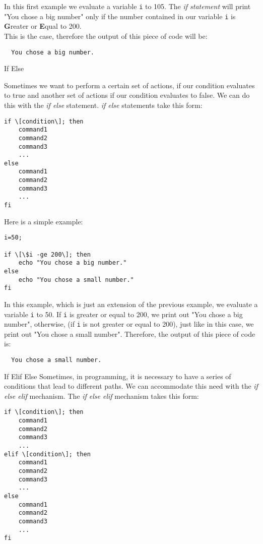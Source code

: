 \documentclass[hidelinks,12pt,a4paper,numbers=enddot]{scrartcl}
\begin{document}
In this first example we evaluate a variable \texttt{i} to 105.
The \emph{ if statement } will print "You chose a big number"
only if the number contained in our variable \texttt{i} is \textbf{G}reater or
\textbf{E}qual to 200. \\
This is the case, therefore the output of this piece of code will be:
\begin{verbatim}
  You chose a big number.
\end{verbatim}




 If Else 

Sometimes we want to perform a certain set of actions, if our condition evaluates to
true and another set of actions if our condition evaluates to false. We can do this with
the \emph{ if else } statement.
\emph{ if else } statements take this form:
\begin{verbatim}
if \[condition\]; then
    command1
    command2
    command3
    ...
else
    command1
    command2
    command3
    ...
fi
\end{verbatim}

Here is a simple example:
\begin{verbatim}
i=50;

if \[\$i -ge 200\]; then
    echo "You chose a big number."
else
    echo "You chose a small number."
fi
\end{verbatim}

In this example, which is just an extension of the previous example, we
evaluate a variable \texttt{i} to 50. If \texttt{i} is greater or equal to
200, we print out "You chose a big number", otherwise,
(if \texttt{i} is not greater or equal to 200), just like in this case, we print out
"You chose a small number".
Therefore, the output of this piece of code is:

\begin{verbatim}
  You chose a small number.
\end{verbatim}




 If Elif Else 
Sometimes, in programming, it is necessary to have a series of conditions that lead to
different paths. We can accommodate this need with the \emph{if else elif} mechanism.
The \emph{if else elif} mechanism takes this form:

\begin{verbatim}
if \[condition\]; then
    command1
    command2
    command3
    ...
elif \[condition\]; then
    command1
    command2
    command3
    ...
else
    command1
    command2
    command3
    ...
fi
\end{verbatim}
\end{document}
